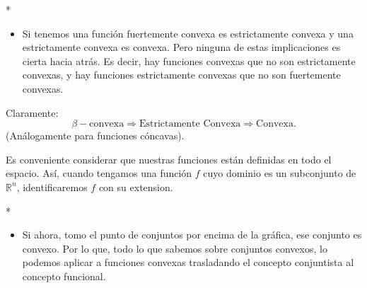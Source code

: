 \begin{paracol}{2}
\switchcolumn[1]*{\noindent\scriptsize
	\begin{itemize}
	    \item Si tenemos una función fuertemente convexa es estrictamente convexa y una estrictamente convexa es convexa. Pero ninguna de estas implicaciones es cierta hacia atrás. Es decir, hay funciones convexas que no son estrictamente convexas, y hay funciones estrictamente convexas que no son fuertemente convexas.
	\end{itemize}
}
\switchcolumn[0]\noindent
\begin{tcolorbox}[colframe=white]
    Claramente:
    $$\beta-\text{convexa}\Rightarrow \text{Estrictamente Convexa} \Rightarrow \text{Convexa}.$$
    (Análogamente para funciones cóncavas).
\end{tcolorbox}

\begin{tcolorbox}[colframe=white]
    Es conveniente considerar que nuestras funciones están definidas en todo el espacio. Así, cuando tengamos una función $f$ cuyo dominio es un subconjunto de $\mathbb{R}^n$, identificaremos $f$ con su extension.
\end{tcolorbox}

\switchcolumn[1]*{\noindent\scriptsize
	\begin{itemize}
	    \item Si ahora, tomo el punto de conjuntos por encima de la gráfica, ese conjunto es convexo. Por lo que, todo lo que sabemos sobre conjuntos convexos, lo podemos aplicar a funciones convexas trasladando el concepto conjuntista al concepto funcional.
	\end{itemize}
}
\switchcolumn[0]\noindent
\begin{center}
\end{center}


\end{paracol}
